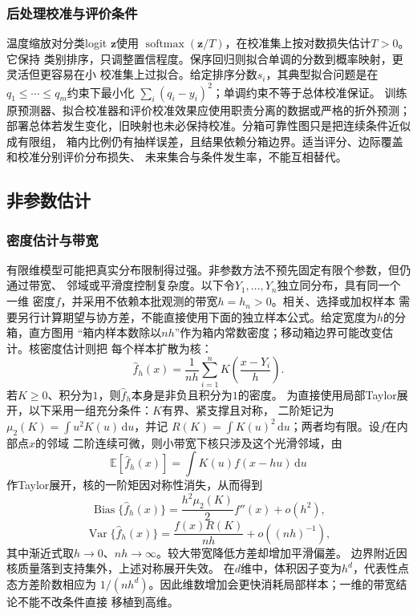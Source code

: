 \subsubsection{后处理校准与评价条件}

温度缩放对分类logit \(\bm z\)使用
\(\operatorname{softmax}(\bm z/T)\)，在校准集上按对数损失估计\(T>0\)。它保持
类别排序，只调整置信程度。保序回归则拟合单调的分数到概率映射，更灵活但更容易在小
校准集上过拟合。给定排序分数\(s_i\)，其典型拟合问题是在
\(q_1\leq\cdots\leq q_m\)约束下最小化
\(\sum_i(q_i-y_i)^2\)；单调约束不等于总体校准保证。
训练原预测器、拟合校准器和评价校准效果应使用职责分离的数据或严格的折外预测；
部署总体若发生变化，旧映射也未必保持校准。分箱可靠性图只是把连续条件近似成有限组，
箱内比例仍有抽样误差，且结果依赖分箱边界。适当评分、边际覆盖和校准分别评价分布损失、
未来集合与条件发生率，不能互相替代。

\subsection{非参数估计}
\label{sec:statistics-nonparametric-missing}

\subsubsection{密度估计与带宽}

有限维模型可能把真实分布限制得过强。非参数方法不预先固定有限个参数，但仍通过带宽、
邻域或平滑度控制复杂度。以下令\(Y_1,\ldots,Y_n\)独立同分布，具有同一个一维
密度\(f\)，并采用不依赖本批观测的带宽\(h=h_n>0\)。相关、选择或加权样本
需要另行计算期望与协方差，不能直接使用下面的独立样本公式。给定宽度为\(h\)的分箱，直方图用
“箱内样本数除以\(nh\)”作为箱内常数密度；移动箱边界可能改变估计。核密度估计则把
每个样本扩散为核：
\[
  \widehat f_h(x)
  =\frac1{nh}\sum_{i=1}^n
    K\left(\frac{x-Y_i}{h}\right).
\]
若\(K\geq0\)、积分为\(1\)，则\(\widehat f_h\)本身是非负且积分为\(1\)的密度。
为直接使用局部Taylor展开，以下采用一组充分条件：\(K\)有界、紧支撑且对称，
二阶矩记为\(\mu_2(K)=\int u^2K(u)\,\mathrm du\)，并记
\(R(K)=\int K(u)^2\,\mathrm du\)；两者均有限。设\(f\)在内部点\(x\)的邻域
二阶连续可微，则小带宽下核只涉及这个光滑邻域，由
\[
  \mathbb{E}[\widehat f_h(x)]
  =\int K(u)f(x-hu)\,\mathrm du
\]
作Taylor展开，核的一阶矩因对称性消失，从而得到
\[
  \operatorname{Bias}\{\widehat f_h(x)\}
  =\frac{h^2\mu_2(K)}2f''(x)+o(h^2),
\]
\[
  \operatorname{Var}\{\widehat f_h(x)\}
  =\frac{f(x)R(K)}{nh}+o((nh)^{-1}),
\]
其中渐近式取\(h\to0\)、\(nh\to\infty\)。较大带宽降低方差却增加平滑偏差。
边界附近因核质量落到支持集外，上述对称展开失效。
在\(d\)维中，体积因子变为\(h^d\)，代表性点态方差阶数相应为
\(1/(nh^d)\)。因此维数增加会更快消耗局部样本；一维的带宽结论不能不改条件直接
移植到高维。

